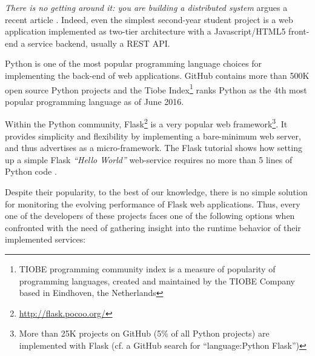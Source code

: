 \documentclass[conference]{IEEEtran}
\begin{document}

{\em There is no getting around it: you are building a distributed system} argues a recent article \cite{cavage2013there}. Indeed, even the simplest second-year student project is a web application implemented as two-tier architecture with a Javascript/HTML5 front-end a service backend, usually a REST API.

Python is one of the most popular programming language choices for implementing the back-end of web applications. GitHub contains more than 500K open source Python projects and the Tiobe Index\footnote{TIOBE programming community index is a measure of popularity of programming languages, created and maintained by the TIOBE Company based in Eindhoven, the Netherlands} ranks Python as the 4th most popular programming language as of June 2016.
 
Within the Python community, Flask\footnote{\url{http://flask.pocoo.org/}} is a very popular web framework\footnote{More than 25K projects on GitHub (5\% of all Python projects) are implemented with Flask (cf. a GitHub search for ``language:Python Flask'')}. It provides simplicity and flexibility by implementing a bare-minimum web server, and thus advertises as a micro-framework. The Flask tutorial shows how setting up a simple Flask {\em ``Hello World''} web-service requires no more than 5 lines of Python code \cite{ flask:tutorial}.
 
Despite their popularity, to the best of our knowledge, there is no simple solution for monitoring the evolving performance of Flask web applications. Thus, every one of the developers of these projects faces one of the following options when confronted with the need of gathering insight into the runtime behavior of their implemented services: 
\end{document}
